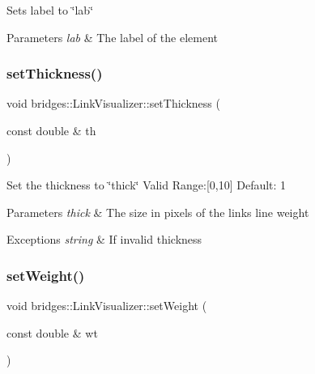Sets label to \char`\"{}lab\char`\"{}


\begin{DoxyParams}{Parameters}
{\em lab} & The label of the element \\
\hline
\end{DoxyParams}
\mbox{\label{classbridges_1_1_link_visualizer_a92a88e0e4c2f0c8c68f33578743c6502}} 
\subsubsection{\texorpdfstring{set\+Thickness()}{setThickness()}}
{\footnotesize\ttfamily void bridges\+::\+Link\+Visualizer\+::set\+Thickness (\begin{DoxyParamCaption}\item[{const double \&}]{th }\end{DoxyParamCaption})\hspace{0.3cm}{\ttfamily [inline]}}

Set the thickness to \char`\"{}thick\char`\"{} Valid Range\+:\mbox{[}0,10\mbox{]} Default\+: 1


\begin{DoxyParams}{Parameters}
{\em thick} & The size in pixels of the link\textquotesingle{}s line weight \\
\hline
\end{DoxyParams}

\begin{DoxyExceptions}{Exceptions}
{\em string} & If invalid thickness \\
\hline
\end{DoxyExceptions}
\mbox{\label{classbridges_1_1_link_visualizer_a08b606d2451026a11e110d0b94f97538}} 
\subsubsection{\texorpdfstring{set\+Weight()}{setWeight()}}
{\footnotesize\ttfamily void bridges\+::\+Link\+Visualizer\+::set\+Weight (\begin{DoxyParamCaption}\item[{const double \&}]{wt }\end{DoxyParamCaption})\hspace{0.3cm}{\ttfamily [inline]}}

